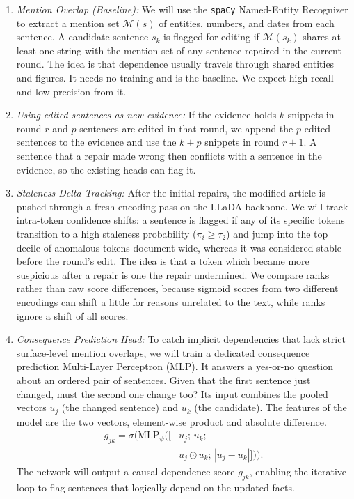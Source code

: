 \documentclass[11pt]{article}
\begin{document}
        \begin{enumerate}[label=(\alph*)]
            \item \emph{Mention Overlap (Baseline):} We will use the \texttt{spaCy} Named-Entity Recognizer to extract a mention set $\mathcal{M}(s)$ of entities, numbers, and dates from each sentence.  A candidate sentence $s_k$ is flagged for editing if $\mathcal{M}(s_k)$ shares at least one string with the mention set of any sentence repaired in the current round.  The idea is that dependence usually travels through shared entities and figures. It needs no training and is the baseline. We expect high recall and low precision from it.
            \item \emph{Using edited sentences as new evidence:} 
            If the evidence holds $k$ snippets in round $r$ and $p$ sentences are edited in that round, we append the $p$ edited sentences to the evidence and use the $k + p$ snippets in round $r + 1$. A sentence that a repair made wrong then conflicts with a sentence in the evidence, so the existing heads can flag it.
            \item \emph{Staleness Delta Tracking:} After the initial repairs, the modified article is pushed through a fresh encoding pass on the LLaDA backbone. We will track intra-token confidence shifts: a sentence is flagged if any of its specific tokens transition to a high staleness probability ($\pi_i \geq \tau_2$) and jump into the top decile of anomalous tokens document-wide, whereas it was considered stable before the round's edit. The idea is
            that a token which became more suspicious after a repair is one the repair undermined. We compare ranks rather than raw score differences, because sigmoid scores from two different encodings can shift a little for reasons unrelated to the text, while ranks ignore a shift of all scores.
            \item \emph{Consequence Prediction Head:} To catch implicit dependencies that lack strict surface-level mention overlaps, we will train a dedicated consequence prediction Multi-Layer Perceptron (MLP). It answers a yes-or-no question about an ordered pair of sentences. Given that the first sentence just changed, must the second one change too? Its input combines the pooled vectors $u_j$ (the changed sentence) and $u_k$ (the candidate). The features of the model are the two vectors, element-wise product and absolute difference.
            \begin{equation}
            \begin{split}
                g_{jk} = \sigma\big(\mathrm{MLP}_{\psi}([&u_j;\, u_k; \\
                &u_j \odot u_k;\, |u_j - u_k|])\big).
            \end{split}
            \end{equation}
            The network will output a causal dependence score $g_{jk}$, enabling the iterative loop to flag sentences that logically depend on the updated facts.
        \end{enumerate}
\end{document}
